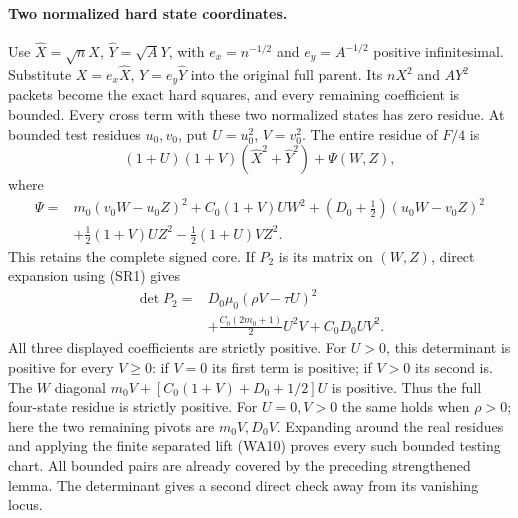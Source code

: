 \paragraph{Two normalized hard state coordinates.}
Use $\widehat X=\sqrt n X$, $\widehat Y=\sqrt A Y$, with
$e_x=n^{-1/2}$ and $e_y=A^{-1/2}$ positive infinitesimal.
Substitute $X=e_x\widehat X$, $Y=e_y\widehat Y$ into the
original full parent. Its $nX^2$ and $AY^2$ packets become the
exact hard squares, and every remaining coefficient is bounded.
Every cross term with these two normalized states has zero residue.
At bounded test residues $u_0,v_0$, put $U=u_0^2$, $V=v_0^2$.
The entire residue of $F/4$ is
\[
 (1+U)(1+V)(\widehat X^2+\widehat Y^2)+\Psi(W,Z),
\]
where
\[
\begin{split}
 \Psi={}&m_0(v_0W-u_0Z)^2+C_0(1+V)U W^2
 +(D_0+\tfrac12)(u_0W-v_0Z)^2\\
 &+\tfrac12(1+V)UZ^2-\tfrac12(1+U)VZ^2.
\end{split}                                                   \tag{SR2}
\]
This retains the complete signed core. If $P_2$ is its matrix on
$(W,Z)$, direct expansion using (SR1) gives
\[
\begin{split}
 \det P_2={}&D_0\mu_0(\rho V-\tau U)^2\\
 &+\frac{C_0(2m_0+1)}2U^2V+C_0D_0UV^2.          
\end{split}                                                   \tag{SR3}
\]
All three displayed coefficients are strictly positive.
For $U>0$, this determinant is positive for every $V\ge0$:
if $V=0$ its first term is positive; if $V>0$ its second is.
The $W$ diagonal $m_0V+[C_0(1+V)+D_0+1/2]U$ is positive.
Thus the full four-state residue is strictly positive.
For $U=0,V>0$ the same holds when $\rho>0$; here the two
remaining pivots are $m_0V,D_0V$.
Expanding around the real residues and applying the finite separated
lift (WA10) proves every such bounded testing chart.
All bounded pairs are already covered by the preceding strengthened
lemma. The determinant gives a second direct check away from its
vanishing locus.

